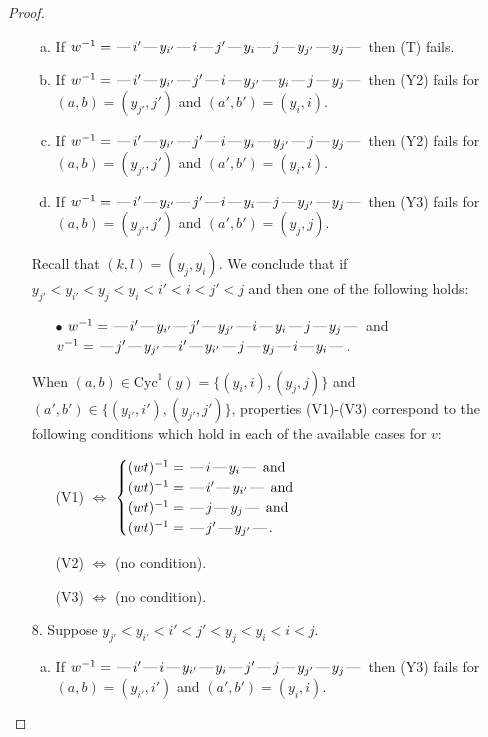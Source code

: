 \documentclass[10pt]{article}
\theoremstyle{definition}
\theoremstyle{definition}
\def\dash{\text{\hspace{0.5mm}---\hspace{0.5mm}}}
\def\Cyc{\mathrm{Cyc}}
\begin{document}
\begin{proof}
\begin{enumerate}
\begin{enumerate}[(a)]
\item If $w^{-1} = \dash i'\dash y_{i'}\dash i\dash j'\dash y_i\dash j\dash y_{j'}\dash y_j\dash $ then (T) fails.
\item If $w^{-1} = \dash i'\dash y_{i'}\dash j'\dash i\dash y_{j'}\dash y_i\dash j\dash y_j\dash $ then (Y2) fails for $(a,b)=(y_{j'},j')$ and $(a',b')=(y_i,i)$.
\item If $w^{-1} = \dash i'\dash y_{i'}\dash j'\dash i\dash y_i\dash y_{j'}\dash j\dash y_j\dash $ then (Y2) fails for $(a,b)=(y_{j'},j')$ and $(a',b')=(y_i,i)$.
\item If $w^{-1} = \dash i'\dash y_{i'}\dash j'\dash i\dash y_i\dash j\dash y_{j'}\dash y_j\dash $ then (Y3) fails for $(a,b)=(y_{j'},j')$ and $(a',b')=(y_j,j)$.
\end{enumerate}
Recall that $(k,l) = (y_j,y_i)$.
We conclude that if $y_{j'} < y_{i'} < y_j < y_i < i' < i < j' < j$ and then one of the following holds:
\begin{enumerate}
\item[$\bullet$] $w^{-1} = \dash i'\dash y_{i'}\dash j'\dash y_{j'}\dash i\dash y_i\dash j\dash y_j\dash $ and $v^{-1} = \dash j'\dash y_{j'}\dash i'\dash y_{i'}\dash j\dash y_j\dash i\dash y_i\dash $.
\end{enumerate}
When $(a,b)\in\Cyc^1(y)=\{(y_i,i),(y_j,j)\}$ and $(a',b')\in\{(y_{i'},i'),(y_{j'},j')\}$,
properties (V1)-(V3) correspond to the following conditions which hold in
each of the available cases for $v$:
\begin{enumerate}
\item[](V1) $\Leftrightarrow$ $\begin{cases}\text{$(wt)^{-1} = \dash i \dash y_i \dash$}\text{ and }\\
\text{$(wt)^{-1} = \dash i' \dash y_{i'} \dash$}\text{ and }\\
\text{$(wt)^{-1} = \dash j \dash y_j \dash$}\text{ and }\\
\text{$(wt)^{-1} = \dash j' \dash y_{j'} \dash$}.\end{cases}$
\item[](V2) $\Leftrightarrow$ (no condition).
\item[](V3) $\Leftrightarrow$ (no condition).
\end{enumerate}
\item[$8$.] Suppose $y_{j'} < y_{i'} < i' < j' < y_j < y_i < i < j$.
\begin{enumerate}[(a)]
\item If $w^{-1} = \dash i'\dash i\dash y_{i'}\dash y_i\dash j'\dash j\dash y_{j'}\dash y_j\dash $ then (Y3) fails for $(a,b)=(y_{i'},i')$ and $(a',b')=(y_i,i)$.

\end{enumerate}
\end{enumerate}
\end{proof}
\end{document}
